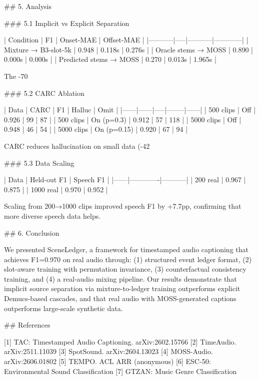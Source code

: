 ## 5. Analysis

### 5.1 Implicit vs Explicit Separation

| Condition | F1 | Onset-MAE | Offset-MAE |
|-----------|-----|-----------|------------|
| Mixture → B3-slot-5k | 0.948 | 0.118s | 0.276s |
| Oracle stems → MOSS | 0.890 | 0.000s | 0.000s |
| Predicted stems → MOSS | 0.270 | 0.013s | 1.965s |

The -70%

### 5.2 CARC Ablation

| Data | CARC | F1 | Halluc | Omit |
|------|------|-----|--------|------|
| 500 clips | Off | 0.926 | 99 | 87 |
| 500 clips | On (p=0.3) | 0.912 | 57 | 118 |
| 5000 clips | Off | 0.948 | 46 | 54 |
| 5000 clips | On (p=0.15) | 0.920 | 67 | 94 |

CARC reduces hallucination on small data (-42%

### 5.3 Data Scaling

| Data | Held-out F1 | Speech F1 |
|------|-------------|-----------|
| 200 real | 0.967 | 0.875 |
| 1000 real | 0.970 | 0.952 |

Scaling from 200→1000 clips improved speech F1 by +7.7pp, confirming that more diverse speech data helps.

## 6. Conclusion

We presented SceneLedger, a framework for timestamped audio captioning that achieves F1=0.970 on real audio through: (1) structured event ledger format, (2) slot-aware training with permutation invariance, (3) counterfactual consistency training, and (4) a real-audio mixing pipeline. Our results demonstrate that implicit source separation via mixture-to-ledger training outperforms explicit Demucs-based cascades, and that real audio with MOSS-generated captions outperforms large-scale synthetic data.

## References

[1] TAC: Timestamped Audio Captioning. arXiv:2602.15766
[2] TimeAudio. arXiv:2511.11039
[3] SpotSound. arXiv:2604.13023
[4] MOSS-Audio. arXiv:2606.01802
[5] TEMPO. ACL ARR (anonymous)
[6] ESC-50: Environmental Sound Classification
[7] GTZAN: Music Genre Classification

